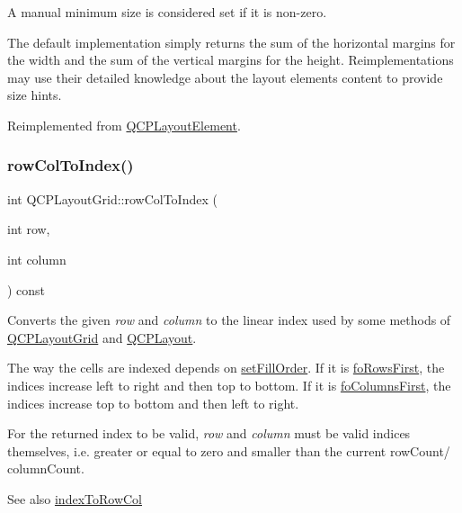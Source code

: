 A manual minimum size is considered set if it is non-\/zero.

The default implementation simply returns the sum of the horizontal margins for the width and the sum of the vertical margins for the height. Reimplementations may use their detailed knowledge about the layout element\textquotesingle{}s content to provide size hints. 

Reimplemented from \mbox{\hyperlink{class_q_c_p_layout_element_a46789036c4fcb190fa374f91321d7c09}{Q\+C\+P\+Layout\+Element}}.

\mbox{\label{class_q_c_p_layout_grid_a682ba76f130810ffd294032a1bfbcfcb}} 
\subsubsection{\texorpdfstring{rowColToIndex()}{rowColToIndex()}}
{\footnotesize\ttfamily int Q\+C\+P\+Layout\+Grid\+::row\+Col\+To\+Index (\begin{DoxyParamCaption}\item[{int}]{row,  }\item[{int}]{column }\end{DoxyParamCaption}) const}

Converts the given {\itshape row} and {\itshape column} to the linear index used by some methods of \mbox{\hyperlink{class_q_c_p_layout_grid}{Q\+C\+P\+Layout\+Grid}} and \mbox{\hyperlink{class_q_c_p_layout}{Q\+C\+P\+Layout}}.

The way the cells are indexed depends on \mbox{\hyperlink{class_q_c_p_layout_grid_affc2f3cfd22f28698c5b29b960d2a391}{set\+Fill\+Order}}. If it is \mbox{\hyperlink{class_q_c_p_layout_grid_a7d49ee08773de6b2fd246edfed353ccaa0202730954e26c474cc820164aedce3e}{fo\+Rows\+First}}, the indices increase left to right and then top to bottom. If it is \mbox{\hyperlink{class_q_c_p_layout_grid_a7d49ee08773de6b2fd246edfed353ccaac4cb4b796ec4822d5894b47b51627fb3}{fo\+Columns\+First}}, the indices increase top to bottom and then left to right.

For the returned index to be valid, {\itshape row} and {\itshape column} must be valid indices themselves, i.\+e. greater or equal to zero and smaller than the current row\+Count/ column\+Count.

\begin{DoxySeeAlso}{See also}
\mbox{\hyperlink{class_q_c_p_layout_grid_a577223db920e2acb34bc1091080c76d1}{index\+To\+Row\+Col}} 
\end{DoxySeeAlso}
\mbox{\label{class_q_c_p_layout_grid_a19c66fd76cbce58a8e94f33797e0c0aa}} 
